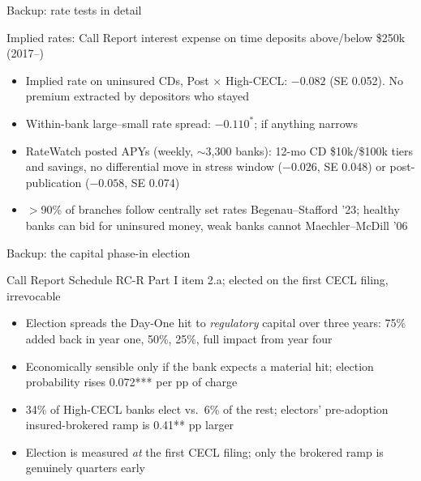 \documentclass[aspectratio=169,10pt]{beamer}
\newcommand{\spec}[1]{{\vspace{-2mm}\textcolor{pgray}{\footnotesize #1}\par\vspace{1mm}}}
\newcommand{\gcite}[1]{{\scriptsize\textcolor{pgray}{#1}}}
\newcommand{\pill}[2]{\hyperlink{#1}{\beamergotobutton{#2}}}
\begin{document}
\begin{frame}[label=apprates]{Backup: rate tests in detail}
  \spec{Implied rates: Call Report interest expense on time deposits above/below \$250k (2017--)}
  \begin{itemize}
    \item Implied rate on uninsured CDs, Post $\times$ High-CECL: $-0.082$
      (SE 0.052). No premium extracted by depositors who stayed
    \item Within-bank large--small rate spread: $-0.110^{*}$; if anything
      narrows
    \item RateWatch posted APYs (weekly, $\sim$3{,}300 banks): 12-mo CD
      \$10k/\$100k tiers and savings, no differential move in stress window
      ($-0.026$, SE 0.048) or post-publication ($-0.058$, SE 0.074)
    \item $>$90\% of branches follow centrally set rates
      \gcite{Begenau--Stafford '23}; healthy banks can bid for uninsured
      money, weak banks cannot \gcite{Maechler--McDill '06}
  \end{itemize}
  \hfill \pill{frates}{back}
\end{frame}

\begin{frame}[label=appphasein]{Backup: the capital phase-in election}
  \spec{Call Report Schedule RC-R Part I item 2.a; elected on the first CECL filing, irrevocable}
  \begin{itemize}
    \item Election spreads the Day-One hit to \emph{regulatory} capital over
      three years: 75\% added back in year one, 50\%, 25\%, full impact from
      year four
    \item Economically sensible only if the bank expects a material hit;
      election probability rises 0.072*** per pp of charge
    \item 34\% of High-CECL banks elect vs.\ 6\% of the rest; electors'
      pre-adoption insured-brokered ramp is 0.41** pp larger
    \item Election is measured \emph{at} the first CECL filing; only the
      brokered ramp is genuinely quarters early
  \end{itemize}
  \hfill \pill{ftiming}{back}
\end{frame}
\end{document}
